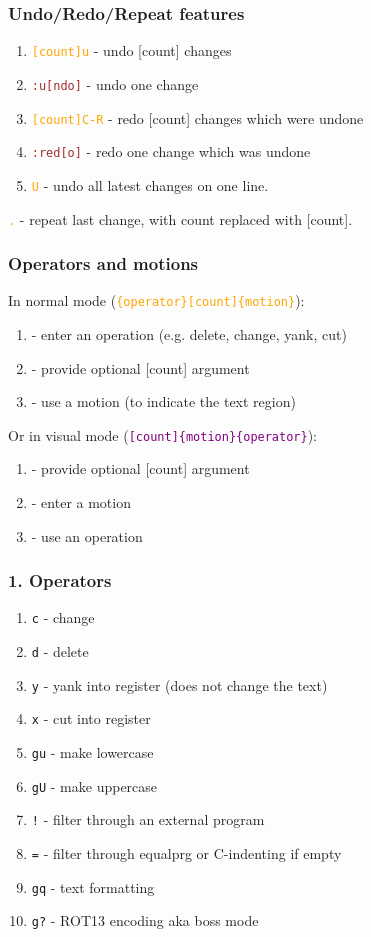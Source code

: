 \documentclass{beamer}
\newcommand{\vimnormal}[1]{\texttt{\textcolor{orange}{#1}}}
\newcommand{\vimcommand}[1]{\texttt{\textcolor{brown}{#1}}}
\newcommand{\vimvisual}[1]{\texttt{\textcolor{purple}{#1}}}
\begin{document}
\begin{frame}
    \frametitle{Undo/Redo/Repeat features}
    \begin{enumerate}
        \item \vimnormal{[count]u}   - undo [count] changes
        \item \vimcommand{:u[ndo]}    - undo one change
        \item \vimnormal{[count]C-R} - redo [count] changes which were undone
        \item \vimcommand{:red[o]}    - redo one change which was undone
        \item \vimnormal{U}          - undo all latest changes on one line.
    \end{enumerate}
    \vimnormal{.}          - repeat last change, with count replaced with [count].
\end{frame}

\begin{frame}
    \frametitle{Operators and motions}
    In normal mode (\vimnormal{\{operator\}[count]\{motion\}}):
    \begin{enumerate}
        \item - enter an operation (e.g. delete, change, yank, cut)
        \item - provide optional [count] argument
        \item - use a motion (to indicate the text region)
    \end{enumerate}
    Or in visual mode (\vimvisual{[count]\{motion\}\{operator\}}):
    \begin{enumerate}
        \item - provide optional [count] argument
        \item - enter a motion
        \item - use an operation
    \end{enumerate}
\end{frame}

\begin{frame}
    \frametitle{1. Operators}
    \begin{enumerate}
        \item \texttt{c}  - change
        \item \texttt{d}  - delete
        \item \texttt{y}  - yank into register (does not change the text)
        \item \texttt{x}  - cut into register
        \item \texttt{gu} - make lowercase
        \item \texttt{gU} - make uppercase
        \item \texttt{!}  - filter through an external program
        \item \texttt{=}  - filter through equalprg or C-indenting if empty
        \item \texttt{gq} - text formatting
        \item \texttt{g?} - ROT13 encoding aka boss mode
    \end{enumerate}
\end{frame}
\end{document}
